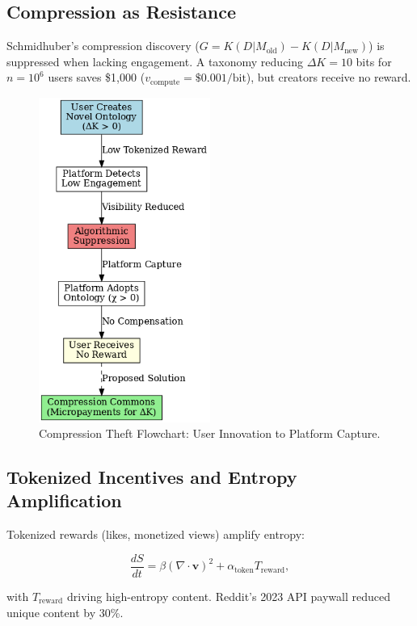 \documentclass[12pt]{article}
\begin{document}
\subsection{Compression as Resistance}

Schmidhuber’s compression discovery (\( G = K(D | M_{\text{old}}) - K(D | M_{\text{new}}) \)) is suppressed when lacking engagement. A taxonomy reducing \(\Delta K = 10\) bits for \( n = 10^6 \) users saves \$1,000 (\( v_{\text{compute}} = \$0.001/\text{bit} \)), but creators receive no reward.

\begin{figure}[h]
\centering
\includegraphics[width=0.5\textwidth]{compression_theft.png}
\caption{Compression Theft Flowchart: User Innovation to Platform Capture.}
\label{fig:compression}
\end{figure}

\subsection{Tokenized Incentives and Entropy Amplification}

Tokenized rewards (likes, monetized views) amplify entropy:

\[
\frac{dS}{dt} = \beta (\nabla \cdot \mathbf{v})^2 + \alpha_{\text{token}} T_{\text{reward}},
\]

with \( T_{\text{reward}} \) driving high-entropy content. Reddit’s 2023 API paywall reduced unique content by 30\%.
\end{document}
